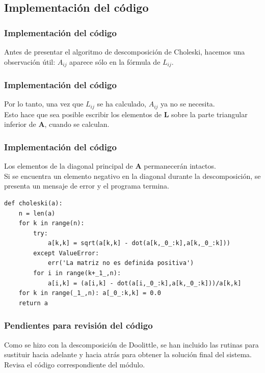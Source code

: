 \subsection{Implementación del código}
\begin{frame}
\frametitle{Implementación del código}
Antes de presentar el algoritmo de descomposición de Choleski, hacemos una observación útil: $A_{ij}$ aparece sólo en la fórmula de $L_{ij}$.
\end{frame}
\begin{frame}
\frametitle{Implementación del código}
Por lo tanto, una vez que $L_{ij}$ se ha calculado, $A_{ij}$ ya no se necesita.
\\
\bigskip
Esto hace que sea posible escribir los elementos de $\mathbf{L}$ sobre la parte triangular inferior de $\mathbf{A}$, cuando se calculan. 
\end{frame}
\begin{frame}
\frametitle{Implementación del código}
Los elementos de la diagonal principal de $\mathbf{A}$ permanecerán intactos. 
\\
\bigskip
Si se encuentra un elemento  negativo en la diagonal durante la descomposición, se presenta un mensaje de error y el programa termina.
\end{frame}
\begin{frame}
\begin{lstlisting}[caption=Algoritmo para la factorización con Choleski, style=FormattedNumber, basicstyle=\linespread{1.1}\ttfamily=\small, columns=fullflexible]
def choleski(a):
    n = len(a)
    for k in range(n):
        try:
            a[k,k] = sqrt(a[k,k] - dot(a[k,_0_:k],a[k,_0_:k]))
        except ValueError:
            err('La matriz no es definida positiva')
        for i in range(k+_1_,n):
            a[i,k] = (a[i,k] - dot(a[i,_0_:k],a[k,_0_:k]))/a[k,k]
    for k in range(_1_,n): a[_0_:k,k] = 0.0
    return a
\end{lstlisting}
\end{frame}
\begin{frame}
\frametitle{Pendientes para revisión del código}
Como se hizo con la descomposición de Doolittle, se han incluido las rutinas para sustituir hacia adelante y hacia atrás para obtener la solución final del sistema.
\\
\bigskip
Revisa el código correspondiente del módulo.
\end{frame}
